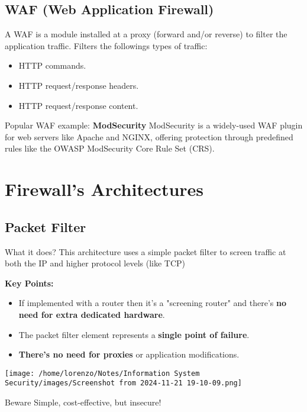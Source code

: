 \subsection{WAF (Web Application Firewall)}
A WAF is a module installed at a proxy (forward and/or reverse) to filter the application traffic. Filters the followings types of traffic:
\begin{itemize}
    \item HTTP commands.
    \item HTTP request/response headers.
    \item HTTP request/response content.
\end{itemize}
\begin{quotebox-grey}{Popular WAF example: \textbf{ModSecurity}}
    ModSecurity is a widely-used WAF plugin for web servers like Apache and NGINX, offering protection through predefined rules like the OWASP ModSecurity Core Rule Set (CRS).
\end{quotebox-grey}

\section{Firewall's Architectures}
\subsection{Packet Filter}
\vspace{0.2cm}
\begin{quotebox-yellow}{What it does?}
This architecture uses a simple packet filter to screen traffic at both the IP and higher protocol levels (like TCP)
\end{quotebox-yellow}
\vspace{0.5cm}
\begin{minipage}{0.5\textwidth}
    \vspace{-0.5cm}
    \textbf{Key Points:}
    \begin{itemize}
        \item If implemented with a router then it's a "screening router" and there's \textbf{no need for extra dedicated hardware}.
        \item The packet filter element represents a \textbf{single point of failure}.
        \item \textbf{There's no need for proxies} or application modifications.
    \end{itemize}
\end{minipage}
\hfill
\begin{minipage}{0.5\textwidth}
    \centering
    \texttt{[image: /home/lorenzo/Notes/Information System Security/images/Screenshot from 2024-11-21 19-10-09.png]}
\end{minipage}
\begin{center}
    \begin{quotebox-red}{Beware}
        Simple, cost-effective, but insecure!
        \end{quotebox-red}   
\end{center}

